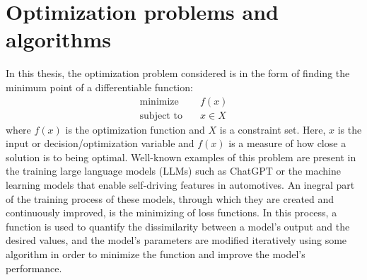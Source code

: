 \section{Optimization problems and algorithms} \label{OpPro}

In this thesis, the optimization problem considered is in the form of finding the minimum point of a differentiable function:
\begin{subequations}\label{opt prob}
  \begin{align}
    \textrm{minimize} &\quad f(x) \\
    \textrm{subject to} &\quad x \in X
  \end{align}
\end{subequations}
where \(f(x)\) is the optimization function and \(X\) is a constraint set. Here, \(x\) is the input or decision/optimization variable and \(f(x)\) is a measure of how close a solution is to being optimal. Well-known examples of this problem are present in the training large language models (LLMs) such as ChatGPT or the machine learning models that enable self-driving features in automotives. An inegral part of the training process of these models, through which they are created and continuously improved, is the minimizing of loss functions. In this process, a function is used to quantify the dissimilarity between a model's output and the desired values, and the model's parameters are modified iteratively using some algorithm in order to minimize the function and improve the model's performance.


